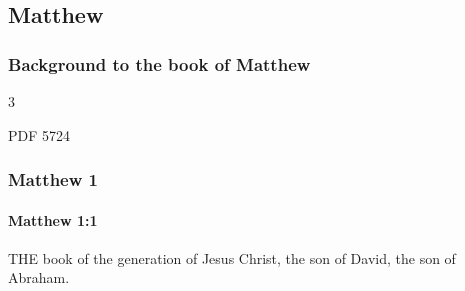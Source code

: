 \subsection{Matthew}
	\label{MATTHEW}
	
	\subsubsection{Background to the book of Matthew}
		\label{MATTHEW-BACKGROUND}
		
		\begin{multicols}{3}
			\begin{compactdesc}
				\item[ABD] PDF 5724
			\end{compactdesc}
		\end{multicols}

	\subsubsection{Matthew 1} %
		\label{MATTHEW-1}
		
		\paragraph{Matthew 1:1} %
			\label{MATTHEW-1-1}

			THE book of the generation of Jesus Christ, the son of David, the son of Abraham.

			\begin{framed}
			\scriptsize
				\begin{compactdesc}
					\item[SBLG] 
				\end{compactdesc}
			\end{framed}

